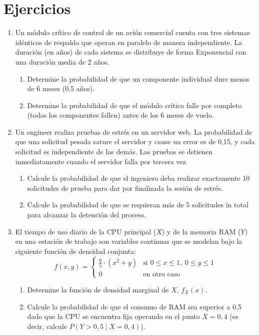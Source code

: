 \documentclass[letterpaper,12pt]{article}
\newenvironment{ejercicios}{%
    \section*{Ejercicios}
}{}
\begin{document}
\begin{ejercicios}
\begin{enumerate}[leftmargin=*,itemsep=0.8em]
    \item Un módulo crítico de control de un avión comercial cuenta con tres sistemas idénticos de respaldo que operan en paralelo de manera independiente. La duración (en años) de cada sistema se distribuye de forma Exponencial con una duración media de 2 años.
    \begin{enumerate}[label=\alph*)]
        \item Determine la probabilidad de que un componente individual dure menos de 6 meses (0,5 años).
        \item Determine la probabilidad de que el módulo crítico falle por completo (todos los componentes fallen) antes de los 6 meses de vuelo.
    \end{enumerate}

    \item Un engineer realiza pruebas de estrés en un servidor web. La probabilidad de que una solicitud pesada sature el servidor y cause un error es de 0,15, y cada solicitud es independiente de las demás. Las pruebas se detienen inmediatamente cuando el servidor falla por tercera vez.
    \begin{enumerate}[label=\alph*)]
        \item Calcule la probabilidad de que el ingeniero deba realizar exactamente 10 solicitudes de prueba para dar por finalizada la sesión de estrés.
        \item Calcule la probabilidad de que se requieran más de 5 solicitudes in total para alcanzar la detención del proceso.
    \end{enumerate}

    \item El tiempo de uso diario de la CPU principal ($X$) y de la memoria RAM ($Y$) en una estación de trabajo son variables continuas que se modelan bajo la siguiente función de densidad conjunta:
    $$f(x, y) = \begin{cases} \frac{6}{5} \cdot (x^2 + y) & \text{si } 0 \leq x \leq 1, \; 0 \leq y \leq 1 \\ 0 & \text{en otro caso} \end{cases}$$
    \begin{enumerate}[label=\alph*)]
        \item Determine la función de densidad marginal de $X$, $f_X(x)$.
        \item Calcule la probabilidad de que el consumo de RAM sea superior a 0,5 dado que la CPU se encuentra fija operando en el punto $X = 0,4$ (es decir, calcule $P(Y > 0,5 \mid X = 0,4)$).
    \end{enumerate}


\end{enumerate}
\end{ejercicios}
\end{document}
